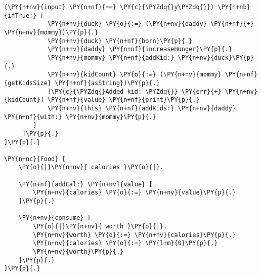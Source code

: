 \begin{Verbatim}[commandchars=\\\{\}]
        (\PY{n+nv}{input} \PY{n+nf}{==} \PY{c}{\PYZdq{}y\PYZdq{}}) \PY{n+nb}{ifTrue:} [
            \PY{n+nv}{duck} \PY{o}{:=} (\PY{n+nv}{daddy} \PY{n+nf}{+} \PY{n+nv}{mommy})\PY{p}{.}
            \PY{n+nv}{duck} \PY{n+nf}{born}\PY{p}{.}
            \PY{n+nv}{daddy} \PY{n+nf}{increaseHunger}\PY{p}{.}
            \PY{n+nv}{mommy} \PY{n+nf}{addKid:} \PY{n+nv}{duck}\PY{p}{.}
            \PY{n+nv}{kidCount} \PY{o}{:=} (\PY{n+nv}{mommy} \PY{n+nf}{getKidsSize} \PY{n+nf}{asString})\PY{p}{.}
            [\PY{c}{\PYZdq{}Added kid: \PYZdq{}} \PY{err}{+} \PY{n+nv}{kidCount}] \PY{n+nf}{value} \PY{n+nf}{print}\PY{p}{.}
            \PY{n+nv}{this} \PY{n+nf}{addKids:} \PY{n+nv}{daddy} \PY{n+nf}{with:} \PY{n+nv}{mommy}\PY{p}{.}
        ] 
     ]\PY{p}{.}
]\PY{p}{.}

\PY{n+nc}{Food} [
    \PY{o}{|}\PY{n+nv}{ calories }\PY{o}{|}.
    
    \PY{n+nf}{addCal:} \PY{n+nv}{value} [
        \PY{n+nv}{calories} \PY{o}{:=} \PY{n+nv}{value}\PY{p}{.}
    ]\PY{p}{.}
    
    \PY{n+nv}{consume} [
        \PY{o}{|}\PY{n+nv}{ worth }\PY{o}{|}.
        \PY{n+nv}{worth} \PY{o}{:=} \PY{n+nv}{calories}\PY{p}{.}
        \PY{n+nv}{calories} \PY{o}{:=} \PY{l+m}{0}\PY{p}{.}
        \PY{n+nv}{worth}\PY{p}{.}
    ]\PY{p}{.}
]\PY{p}{.}
\end{Verbatim}

